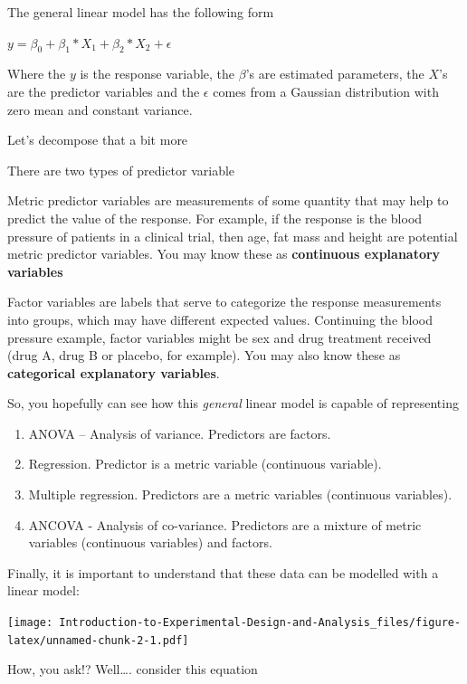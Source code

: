 \documentclass[
]{book}
\providecommand{\tightlist}{%
  \setlength{\itemsep}{0pt}\setlength{\parskip}{0pt}}
\begin{document}
The general linear model has the following form

\(y = \beta_{0}+\beta_{1}*X_{1}+\beta_{2}*X_{2}+\epsilon\)

Where the \(y\) is the response variable, the \(\beta\)'s are estimated parameters, the \(X\)'s are the predictor variables and the \(\epsilon\) comes from a Gaussian distribution with zero mean and constant variance.

Let's decompose that a bit more

There are two types of predictor variable

Metric predictor variables are measurements of some quantity that may help to predict the value of the response. For example, if the response is the blood pressure of patients in a clinical trial, then age, fat mass and height are potential metric predictor variables. You may know these as \textbf{continuous explanatory variables}

Factor variables are labels that serve to categorize the response measurements into groups, which may have different expected values. Continuing the blood pressure example, factor variables might be sex and drug treatment received (drug A, drug B or placebo, for example). You may also know these as \textbf{categorical explanatory variables}.

So, you hopefully can see how this \emph{general} linear model is capable of representing

\begin{enumerate}
\def\labelenumi{\arabic{enumi}.}
\tightlist
\item
  ANOVA -- Analysis of variance. Predictors are factors.
\item
  Regression. Predictor is a metric variable (continuous variable).\\
\item
  Multiple regression. Predictors are a metric variables (continuous variables).
\item
  ANCOVA - Analysis of co-variance. Predictors are a mixture of metric variables (continuous variables) and factors.
\end{enumerate}

Finally, it is important to understand that these data can be modelled with a linear model:

\texttt{[image: Introduction-to-Experimental-Design-and-Analysis\_files/figure-latex/unnamed-chunk-2-1.pdf]}

How, you ask!? Well\ldots. consider this equation
\end{document}
